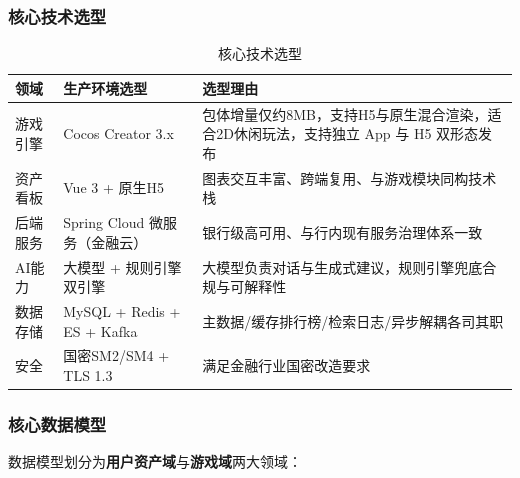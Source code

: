 \documentclass[12pt,a4paper]{ctexart}
\begin{document}
\subsubsection{核心技术选型}
\begin{table}[htbp]
\centering
\begin{tabular}{p{3cm}p{4.5cm}p{5cm}}
\toprule
\textbf{领域} & \textbf{生产环境选型} & \textbf{选型理由} \\
\midrule
游戏引擎 & Cocos Creator 3.x & 包体增量仅约8MB，支持H5与原生混合渲染，适合2D休闲玩法，支持独立 App 与 H5 双形态发布 \\
资产看板 & Vue 3 + 原生H5 & 图表交互丰富、跨端复用、与游戏模块同构技术栈 \\
后端服务 & Spring Cloud 微服务（金融云） & 银行级高可用、与行内现有服务治理体系一致 \\
AI能力 & 大模型 + 规则引擎双引擎 & 大模型负责对话与生成式建议，规则引擎兜底合规与可解释性 \\
数据存储 & MySQL + Redis + ES + Kafka & 主数据/缓存排行榜/检索日志/异步解耦各司其职 \\
安全 & 国密SM2/SM4 + TLS 1.3 & 满足金融行业国密改造要求 \\
\bottomrule
\end{tabular}
\caption{核心技术选型}
\end{table}

\subsubsection{核心数据模型}
数据模型划分为\textbf{用户资产域}与\textbf{游戏域}两大领域：
\end{document}

